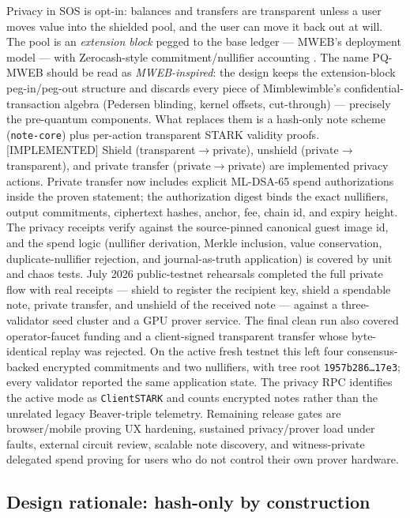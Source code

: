 \documentclass[11pt]{article}
\newcommand{\code}[1]{\texttt{#1}}
\newcommand{\mldsa}{ML\mbox{-}DSA\mbox{-}65}
\newcommand{\statusI}{\textcolor{statgreen}{\textsf{\scriptsize[IMPLEMENTED]}}}
\theoremstyle{plain}
\theoremstyle{definition}
\theoremstyle{remark}
\begin{document}
Privacy in SOS is opt-in: balances and transfers are transparent unless a
user moves value into the shielded pool, and the user can move it back out at
will. The pool is an \emph{extension block} pegged to the base ledger ---
MWEB's deployment model \cite{mweb2020} --- with Zerocash-style
commitment/nullifier accounting \cite{zerocash2014}. The name PQ-MWEB should
be read as \emph{MWEB-inspired}: the design keeps the extension-block
peg-in/peg-out structure and discards every piece of Mimblewimble's
confidential-transaction algebra (Pedersen blinding, kernel offsets,
cut-through) --- precisely the pre-quantum components. What replaces them is
a hash-only note scheme (\code{note-core}) plus per-action transparent STARK
validity proofs. \statusI{} Shield (transparent$\to$private), unshield
(private$\to$transparent), and private transfer (private$\to$private) are
implemented privacy actions. Private transfer now includes explicit
\mldsa{} spend authorizations inside the proven statement; the authorization
digest binds the exact nullifiers, output commitments, ciphertext hashes,
anchor, fee, chain id, and expiry height. The privacy receipts verify against
the source-pinned canonical guest image id, and the spend logic (nullifier
derivation, Merkle inclusion, value conservation, duplicate-nullifier
rejection, and journal-as-truth application) is covered by unit and chaos
tests. July 2026 public-testnet rehearsals completed the full private flow with
real receipts --- shield to register the recipient key, shield a spendable
note, private transfer, and unshield of the received note --- against a
three-validator seed cluster and a GPU prover service. The final clean run also
covered operator-faucet funding and a client-signed transparent transfer whose
byte-identical replay was rejected. On the active fresh testnet this left four
consensus-backed encrypted commitments and two nullifiers, with tree root
\code{1957b286\ldots 17e3}; every validator reported the same application
state. The privacy RPC identifies the active mode as \code{ClientSTARK} and
counts encrypted notes rather than the unrelated legacy Beaver-triple
telemetry. Remaining release gates are browser/mobile proving UX hardening,
sustained privacy/prover load under faults, external circuit review, scalable
note discovery, and witness-private delegated spend proving for users who do
not control their own prover hardware.

\subsection{Design rationale: hash-only by construction}
\label{sec:privacy-rationale}
\end{document}
